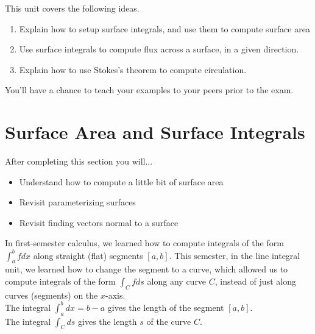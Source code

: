 
\noindent 
This unit covers the following ideas.     
\begin{enumerate}
\item Explain how to setup surface integrals, and use them to compute surface area
\item Use surface integrals to compute flux across a surface, in a given direction. %
\item Explain how to use Stokes's theorem to compute circulation. %
\end{enumerate}
You'll have a chance to teach your examples to your peers prior to the exam.

\section{Surface Area and Surface Integrals}
After completing this section you will...
\begin{itemize}
\item Understand how to compute a little bit of surface area
\item Revisit parameterizing surfaces
\item Revisit finding vectors normal to a surface
\end{itemize}



In first-semester calculus, we learned how to compute integrals of the form $\int_a^b f dx$ along straight (flat) segments $[a,b]$. This semester, in the line integral unit, we learned how to change the segment to a curve, which allowed us to compute integrals of the form $\int_C fds$ along any curve $C$, instead of just along curves (segments) on the $x$-axis. \\

The integral $\int_a^b dx=b-a$ gives the length of the segment $[a,b]$. \\
The integral $\int_C ds$ gives the length $s$ of the curve $C$.\\

